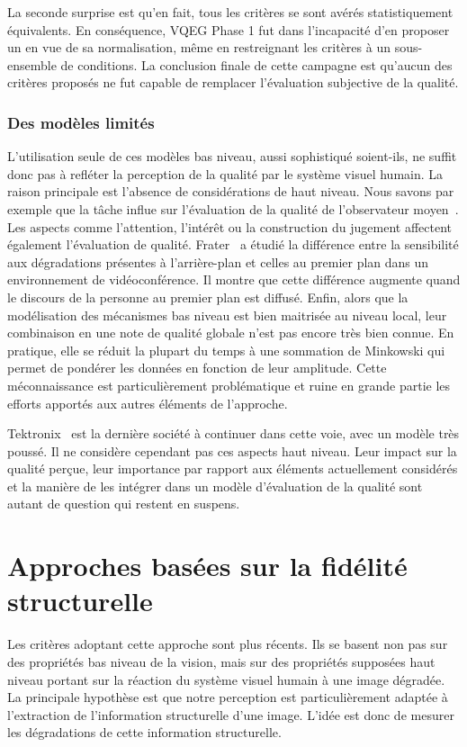 La seconde surprise est qu'en fait, tous les critères se sont avérés statistiquement équivalents. En conséquence, VQEG Phase 1 fut dans l'incapacité d'en proposer un en vue de sa normalisation, même en restreignant les critères à un sous-ensemble de conditions. La conclusion finale de cette campagne est qu'aucun des critères proposés ne fut capable de remplacer l'évaluation subjective de la qualité.


\subsubsection{Des modèles limités}
L'utilisation seule de ces modèles bas niveau, aussi sophistiqué soient-ils, ne suffit donc pas à refléter la perception de la qualité par le système visuel humain. La raison principale est l'absence de considérations de haut niveau. Nous savons par exemple que la tâche influe sur l'évaluation de la qualité de l'observateur moyen~\cite{fuhrmann-jei1995}. Les aspects comme l'attention, l'intérêt ou la construction du jugement affectent également l'évaluation de qualité. Frater~\cite{frater-ieee2001} a étudié la différence entre la sensibilité aux dégradations présentes à l'arrière-plan et celles au premier plan dans un environnement de vidéoconférence. Il montre que cette différence augmente quand le discours de la personne au premier plan est diffusé. Enfin, alors que la modélisation des mécanismes bas niveau est bien maitrisée au niveau local, leur combinaison en une note de qualité globale n'est pas encore très bien connue. En pratique, elle se réduit la plupart du temps à une sommation de Minkowski qui permet de pondérer les données en fonction de leur amplitude. Cette méconnaissance est particulièrement problématique et ruine en grande partie les efforts apportés aux autres éléments de l'approche.

Tektronix~\cite{ferguson-vpqm2007} est la dernière société à continuer dans cette voie, avec un modèle très poussé. Il ne considère cependant pas ces aspects haut niveau. Leur impact sur la qualité perçue, leur importance par rapport aux éléments actuellement considérés et la manière de les intégrer dans un modèle d'évaluation de la qualité sont autant de question qui restent en suspens.


\section{Approches basées sur la fidélité structurelle}
Les critères adoptant cette approche sont plus récents. Ils se basent non pas sur des propriétés bas niveau de la vision, mais sur des propriétés supposées haut niveau portant sur la réaction du système visuel humain à une image dégradée. La principale hypothèse est que notre perception est particulièrement adaptée à l'extraction de l'information structurelle d'une image. L'idée est donc de mesurer les dégradations de cette information structurelle.

